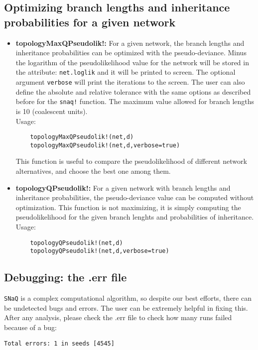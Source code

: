 \documentclass[12pt]{article}
\begin{document}
\subsection{Optimizing branch lengths and inheritance probabilities
  for a given network}
\begin{itemize}
\item \textbf{topologyMaxQPseudolik!:} For a given network, the branch
  lengths and inheritance probabilities can be optimized with the
  pseudo-deviance. Minus the logarithm of the pseudolikelihood value
  for the network will be stored in the attribute: \texttt{net.loglik}
  and it will be printed to screen. The optional argument
  \texttt{verbose} will print the iterations to the screen. The user
  can also define the absolute and relative tolerance with the same
  options as described before for the \texttt{snaq!} function. The
  maximum value allowed for branch lengths is 10 (coalescent units).
  \\
  Usage:
  \begin{lstlisting}
    topologyMaxQPseudolik!(net,d)
    topologyMaxQPseudolik!(net,d,verbose=true)
  \end{lstlisting}
  This function is useful to compare the pseudolikelihood of different
  network alternatives, and choose the best one among them.

\item \textbf{topologyQPseudolik!:} For a given network with branch
  lengths and inheritance probabilities, the pseudo-deviance value can
  be computed without optimization. This function is not
  maximizing, it is simply computing the pseudolikelihood for the
  given branch lenghts and probabilities of inheritance.
  \\
  Usage:
  \begin{lstlisting}
    topologyQPseudolik!(net,d)
    topologyQPseudolik!(net,d,verbose=true)
  \end{lstlisting}
\end{itemize}



\subsection{Debugging: the .err file}
\texttt{SNaQ} is a complex computational algorithm, so despite our
best efforts, there can be undetected bugs and errors. The user can be
extremely helpful in fixing this.  After any analysis, please check
the .err file to check how many runs failed because of a bug:
\begin{lstlisting}
Total errors: 1 in seeds [4545]
\end{lstlisting}
\end{document}

